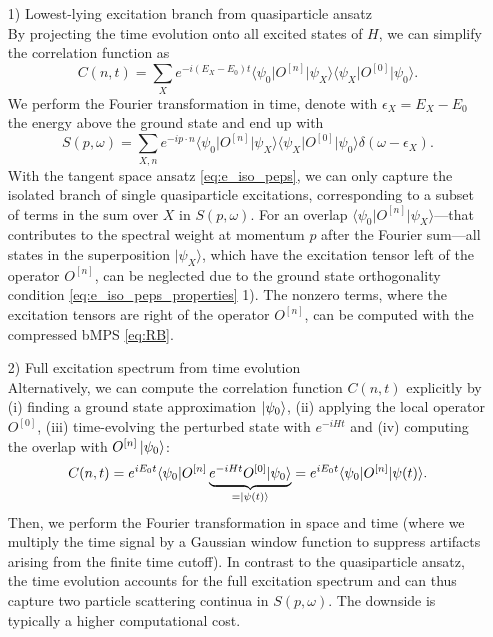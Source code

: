 \begin{enumerate}
	\item[1)] Lowest-lying excitation branch from quasiparticle ansatz \\[0.5em]
	By projecting the time evolution onto all excited states of $H$, we can simplify the correlation function as
	\begin{equation}
		C(n, t) = \sum_X e^{-i(E_X - E_0)t} \langle \psi_0 \vert O^{[n]} \vert \psi_X \rangle \langle \psi_X \vert O^{[0]} \vert \psi_0 \rangle.
	\end{equation}
	We perform the Fourier transformation in time, denote with $\epsilon_X = E_X - E_0$ the energy above the ground state and end up with
	\begin{equation}
		S(p, \omega) = \sum_{X, n} e^{-ip \cdot n} \langle \psi_0 \vert O^{[n]} \vert \psi_X \rangle \langle \psi_X \vert O^{[0]} \vert \psi_0 \rangle \delta(\omega - \epsilon_X).
	\end{equation}
	With the tangent space ansatz \eqref{eq:e_iso_peps}, we can only capture the isolated branch of single quasiparticle excitations, corresponding to a subset of terms in the sum over $X$ in $S(p, \omega)$. For an overlap $\langle \psi_0 \vert O^{[n]} \vert \psi_X \rangle$---that contributes to the spectral weight at momentum $p$ after the Fourier sum---all states in the superposition $\vert \psi_X \rangle$, which have the excitation tensor left of the operator $O^{[n]}$, can be neglected due to the ground state orthogonality condition \eqref{eq:e_iso_peps_properties} 1). The nonzero terms, where the excitation tensors are right of the operator $O^{[n]}$, can be computed with the compressed bMPS \eqref{eq:RB}.
	\item[2)] Full excitation spectrum from time evolution \\[0.5em]
	Alternatively, we can compute the correlation function $C(n, t)$ explicitly by (i) finding a ground state approximation $\ket{\psi_0}$, (ii) applying the local operator $O^{[0]}$, (iii) time-evolving the perturbed state with $e^{-iHt}$ and (iv) computing the overlap with $O^{[n]}\ket{\psi_0}$:
	\begin{equation}
		C(n, t) = e^{iE_0t} \langle \psi_0 \vert O^{[n]} \underbrace{e^{-iHt} O^{[0]} \vert \psi_0 \rangle}_{= \ket{\psi(t)}} 
		= e^{iE_0t} \langle \psi_0 \vert O^{[n]} \vert \psi(t) \rangle.
	\end{equation}
	Then, we perform the Fourier transformation in space and time (where we multiply the time signal by a Gaussian window function to suppress artifacts arising from the finite time cutoff). In contrast to the quasiparticle ansatz, the time evolution accounts for the full excitation spectrum and can thus capture two particle scattering continua in $S(p, \omega)$. The downside is typically a higher computational cost.
\end{enumerate}
